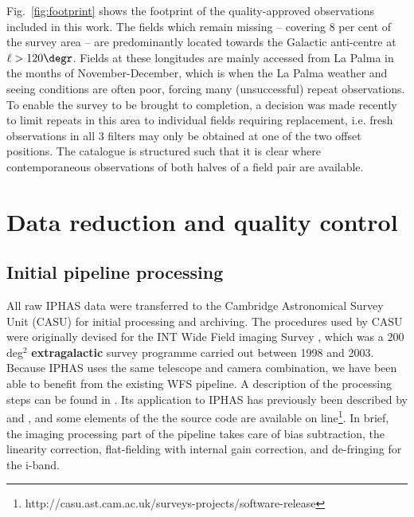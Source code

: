 \documentclass[a4paper,useAMS,usenatbib]{mn2e}
\begin{document}
Fig.~\ref{fig:footprint} shows the footprint
of the quality-approved observations included in this work. 
The fields which remain missing 
-- covering 8 per cent of the survey area --
are predominantly located towards the Galactic anti-centre 
at $\ell > 120\degr$.
Fields at these longitudes are mainly accessed from La Palma 
in the months of November-December,
which is when the La Palma weather and seeing conditions are often poor,
forcing many (unsuccessful) repeat observations.
To enable the survey to be brought to completion, 
a decision was made recently to limit repeats in this area 
to individual fields requiring replacement,
i.e. fresh observations in all 3 filters may only be obtained 
at one of the two offset positions.  
The catalogue is structured such that it is clear 
where contemporaneous observations of both halves of a field pair
are available.


\section{Data reduction and quality control}
\label{sec:reduction}

\subsection{Initial pipeline processing}

All raw IPHAS data were transferred to the Cambridge Astronomical Survey Unit 
(CASU) for initial processing and archiving.  The procedures used by CASU 
were originally devised for the INT Wide Field imaging Survey 
\citep[WFS;][]{McMahon2001,Irwin2005}, which was a 200 deg$^2$ 
{\bf extragalactic} survey programme carried out between 1998 and 2003.
Because IPHAS uses the same telescope and camera combination, we have been 
able to benefit from the existing WFS pipeline. A description of the 
processing steps can be found in \citet{Irwin2001}. Its application to IPHAS 
has previously been described
by \citet{Drew2005} and \citet{Gonzalez-Solares2008},
and some elements of the the source code are available 
on line\footnote{http://casu.ast.cam.ac.uk/surveys-projects/software-release}. 
In brief, the imaging processing part of the pipeline takes care of bias 
subtraction, the linearity correction, flat-fielding with internal gain
correction, and de-fringing for the i-band.
\end{document}

